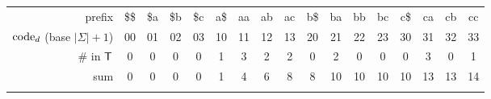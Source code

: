 \begin{tabular}{!{\color{white}\vrule} r !{\color{white}\vrule} c !{\color{white}\vrule} c !{\color{white}\vrule} c !{\color{white}\vrule} c !{\color{white}\vrule} c !{\color{white}\vrule} c !{\color{white}\vrule} c !{\color{white}\vrule} c !{\color{white}\vrule} c !{\color{white}\vrule} c !{\color{white}\vrule} c !{\color{white}\vrule} c !{\color{white}\vrule} c !{\color{white}\vrule} c !{\color{white}\vrule} c !{\color{white}\vrule} c !{\color{white}\vrule}}
	\hline
	prefix & \$\$ & \$a & \$b & \$c & a\$ & aa & ab & ac & b\$ & ba & bb & bc & c\$ & ca & cb & cc \\
	\hline
	\hline
	\(\textup{code}_d\) (base \(|\Sigma| + 1\)) & 00 & 01 & 02 & 03 & 10 & 11 & 12 & 13 & 20 & 21 & 22 & 23 & 30 & 31 & 32 & 33 \\
	\hline
	\# in \(\inputtext\) & 0 & 0 & 0 & 0 & 1 & 3 & 2 & 2 & 0 & 2 & 0 & 0 & 0 & 3 & 0 & 1 \\
	\hline
	sum         & 0 & 0 & 0 & 0 & 1 & 4 & 6 & 8 & 8 & 10 & 10 & 10 & 10 & 13 & 13 & 14 \\
	\hline
\end{tabular}
